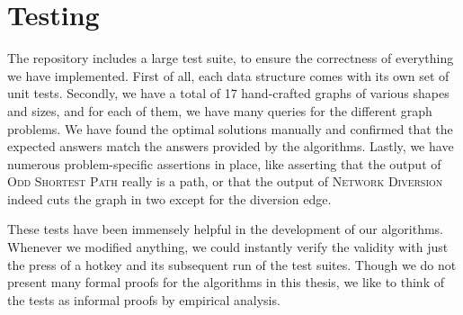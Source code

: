 \section{Testing}
The repository includes a large test suite, to ensure the correctness of everything we have implemented. First of all, each data structure comes with its own set of unit tests. Secondly, we have a total of 17 hand-crafted graphs of various shapes and sizes, and for each of them, we have many queries for the different graph problems. We have found the optimal solutions manually and confirmed that the expected answers match the answers provided by the algorithms. Lastly, we have numerous problem-specific assertions in place, like asserting that the output of \textsc{Odd Shortest Path} really is a path, or that the output of \textsc{Network Diversion} indeed cuts the graph in two except for the diversion edge.

These tests have been immensely helpful in the development of our algorithms. Whenever we modified anything, we could instantly verify the validity with just the press of a hotkey and its subsequent run of the test suites. Though we do not present many formal proofs for the algorithms in this thesis, we like to think of the tests as informal proofs by empirical analysis.